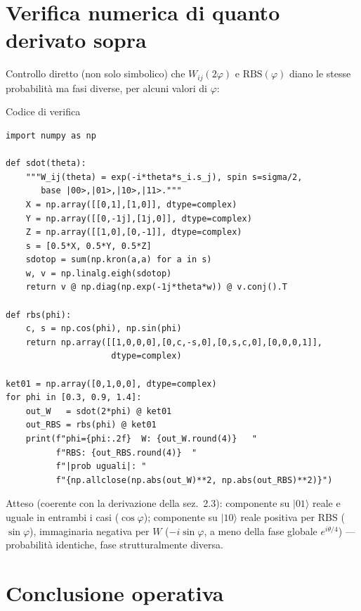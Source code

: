 \documentclass[11pt,a4paper]{article}
\begin{document}
\section{Verifica numerica di quanto derivato sopra}

Controllo diretto (non solo simbolico) che $W_{ij}(2\varphi)$ e
$\mathrm{RBS}(\varphi)$ diano le stesse probabilità ma fasi diverse,
per alcuni valori di $\varphi$:

\begin{panelbox}{Codice di verifica}
\small
\begin{verbatim}
import numpy as np

def sdot(theta):
    """W_ij(theta) = exp(-i*theta*s_i.s_j), spin s=sigma/2,
       base |00>,|01>,|10>,|11>."""
    X = np.array([[0,1],[1,0]], dtype=complex)
    Y = np.array([[0,-1j],[1j,0]], dtype=complex)
    Z = np.array([[1,0],[0,-1]], dtype=complex)
    s = [0.5*X, 0.5*Y, 0.5*Z]
    sdotop = sum(np.kron(a,a) for a in s)
    w, v = np.linalg.eigh(sdotop)
    return v @ np.diag(np.exp(-1j*theta*w)) @ v.conj().T

def rbs(phi):
    c, s = np.cos(phi), np.sin(phi)
    return np.array([[1,0,0,0],[0,c,-s,0],[0,s,c,0],[0,0,0,1]],
                     dtype=complex)

ket01 = np.array([0,1,0,0], dtype=complex)
for phi in [0.3, 0.9, 1.4]:
    out_W   = sdot(2*phi) @ ket01
    out_RBS = rbs(phi) @ ket01
    print(f"phi={phi:.2f}  W: {out_W.round(4)}   "
          f"RBS: {out_RBS.round(4)}  "
          f"|prob uguali|: "
          f"{np.allclose(np.abs(out_W)**2, np.abs(out_RBS)**2)}")
\end{verbatim}
\end{panelbox}

Atteso (coerente con la derivazione della sez.~2.3): componente su
$|01\rangle$ reale e uguale in entrambi i casi ($\cos\varphi$);
componente su $|10\rangle$ reale positiva per RBS ($\sin\varphi$),
immaginaria negativa per $W$ ($-i\sin\varphi$, a meno della fase
globale $e^{i\theta/4}$) --- probabilità identiche, fase
strutturalmente diversa.

\section{Conclusione operativa}
\end{document}
